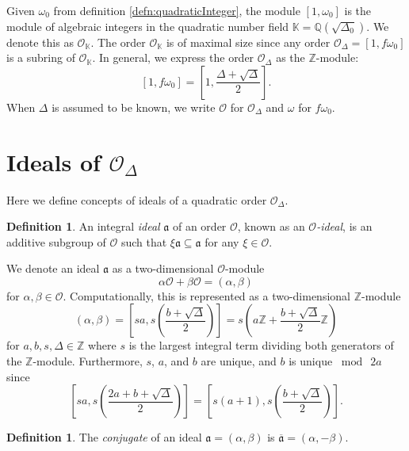 \documentclass{ucalgthes1}
\theoremstyle{plain}
\theoremstyle{definition}
\newtheorem{defn}[thm]{Definition}
\newcommand{\KK}{\mathbb{K}}
\newcommand{\OO}{\mathcal{O}}
\newcommand{\ZZ}{\mathbb{Z}}
\newcommand{\QQ}{\mathbb{Q}}
\begin{document}
\bigbreak
Given $\omega_0$ from definition \ref{defn:quadraticInteger}, the module $[1, \omega_0]$ is the module of algebraic integers in the quadratic number field $\KK=\QQ(\sqrt{\Delta_0})$.  We denote this as $\OO_{\KK}$.  The order $\OO_\KK$ is of maximal size since any order $\OO_\Delta = [1,f\omega_0]$ is a subring of $\OO_\KK$. In general, we express the order $\OO_\Delta$ as the $\ZZ$-module:
\[
	[1,f\omega_0] = \left[1, \frac{\Delta + \sqrt{\Delta}}{2} \right].
\]
When $\Delta$ is assumed to be known, we write $\OO$ for $\OO_\Delta$ and $\omega$ for $f\omega_0$.


\bigbreak
\section{Ideals of $\OO_\Delta$}

Here we define concepts of ideals of a quadratic order $\OO_\Delta$.

\begin{defn}
An integral \emph{ideal} $\mathfrak{a}$ of an order $\OO$, known as an \emph{$\OO$-ideal}, is an additive subgroup of $\OO$ such that $\xi \mathfrak{a} \subseteq \mathfrak{a}$ for any $\xi \in \OO$.
\end{defn}

We denote an ideal $\mathfrak{a}$ as a two-dimensional $\OO$-module
\[
	\alpha \OO + \beta \OO = (\alpha, \beta)
\]
for $\alpha, \beta \in \OO$.  Computationally, this is represented as a two-dimensional $\ZZ$-module
\begin{equation}
\label{eq:idealZModule}
	(\alpha, \beta) = \left[sa, s\left( \frac{b+ \sqrt{\Delta}}{2} \right) \right] = s \left(a \ZZ + \frac{b + \sqrt{\Delta}}{2} \ZZ \right)
\end{equation}
for $a,b,s,\Delta \in \ZZ$ where $s$ is the largest integral term dividing both generators of the $\ZZ$-module. Furthermore, $s$, $a$, and $b$ are unique, and $b$ is unique $\bmod~2a$ since
\begin{equation*}
	\left[sa, s\left(\frac{2a+b+\sqrt{\Delta}}{2}\right)\right] = \left[s(a+1), s\left(\frac{b+\sqrt{\Delta}}{2}\right)\right].
\end{equation*}

\vspace{1ex}
\begin{defn}
The \emph{conjugate} of an ideal $\mathfrak{a} = (\alpha, \beta)$ is $\overline{\mathfrak{a}} = (\alpha, -\beta)$.
\end{defn}
\end{document}
